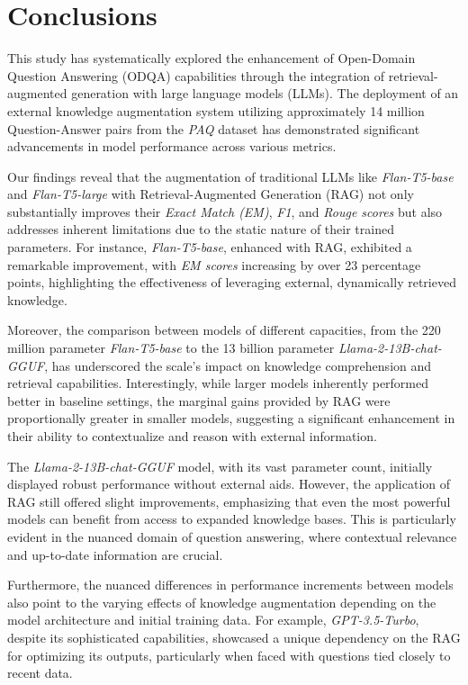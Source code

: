 \section{Conclusions}

This study has systematically explored the enhancement of Open-Domain Question Answering (ODQA) capabilities through the integration of retrieval-augmented generation with large language models (LLMs). The deployment of an external knowledge augmentation system utilizing approximately 14 million Question-Answer pairs from the \emph{PAQ} dataset has demonstrated significant advancements in model performance across various metrics.

Our findings reveal that the augmentation of traditional LLMs like \emph{Flan-T5-base} and \emph{Flan-T5-large} with Retrieval-Augmented Generation (RAG) not only substantially improves their \emph{Exact Match (EM)}, \emph{F1}, and \emph{Rouge scores} but also addresses inherent limitations due to the static nature of their trained parameters. For instance, \emph{Flan-T5-base}, enhanced with RAG, exhibited a remarkable improvement, with \emph{EM scores} increasing by over 23 percentage points, highlighting the effectiveness of leveraging external, dynamically retrieved knowledge.

Moreover, the comparison between models of different capacities, from the 220 million parameter \emph{Flan-T5-base} to the 13 billion parameter \emph{Llama-2-13B-chat-GGUF}, has underscored the scale's impact on knowledge comprehension and retrieval capabilities. Interestingly, while larger models inherently performed better in baseline settings, the marginal gains provided by RAG were proportionally greater in smaller models, suggesting a significant enhancement in their ability to contextualize and reason with external information.

The \emph{Llama-2-13B-chat-GGUF} model, with its vast parameter count, initially displayed robust performance without external aids. However, the application of RAG still offered slight improvements, emphasizing that even the most powerful models can benefit from access to expanded knowledge bases. This is particularly evident in the nuanced domain of question answering, where contextual relevance and up-to-date information are crucial.

Furthermore, the nuanced differences in performance increments between models also point to the varying effects of knowledge augmentation depending on the model architecture and initial training data. For example, \emph{GPT-3.5-Turbo}, despite its sophisticated capabilities, showcased a unique dependency on the RAG for optimizing its outputs, particularly when faced with questions tied closely to recent data.

